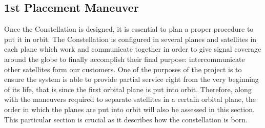 \subsection{1st Placement Maneuver}
Once the Constellation is designed, it is essential to plan a proper procedure to put it in orbit. The Constellation is configured in several planes and satellites in each plane which work and communicate together in order to give signal coverage around the globe to finally accomplish their final purpose: intercommunicate other satellites form our customers.
\newline\newline
One of the purposes of the project is to ensure the system is able to provide partial service right from the very beginning of its life, that is since the first orbital plane is put into orbit. Therefore, along with the maneuvers required to separate satellites in a certain orbital plane, the order in which the planes are put into orbit will also be assessed in this section. This particular section is crucial as it describes how the constellation is born.
